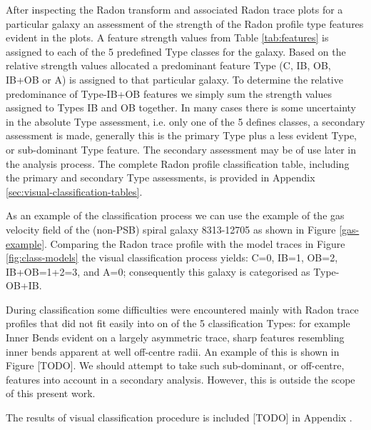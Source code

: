 After inspecting the Radon transform and associated Radon trace plots for a particular galaxy an assessment of the strength of the Radon profile type features evident in the plots. A feature strength values from Table \ref{tab:features} is assigned to each of the 5 predefined Type classes for the galaxy. Based on the relative strength values allocated a predominant feature Type (C, IB, OB, IB+OB or A) is assigned to that particular galaxy. To determine the relative predominance of Type-IB+OB features we simply sum the strength values assigned to Types IB and OB together. 
In many cases there is some uncertainty in the absolute Type assessment, i.e. only one of the 5 defines classes, a secondary assessment is made,  generally this is the primary Type plus a less evident Type, or sub-dominant Type feature. The secondary assessment may be of use later in the analysis process. The complete Radon profile classification table, including the primary and secondary Type assessments, is provided in Appendix \ref{sec:visual-classification-tables}.

As an example of the classification process we can use the example of the gas velocity field of the (non-PSB) spiral galaxy 8313-12705 as shown in Figure \ref{gas-example}. Comparing the Radon trace profile with the model traces in Figure \ref{fig:class-models} the visual classification process yields: C=0, IB=1, OB=2, IB+OB=1+2=3, and A=0; consequently this galaxy is categorised as Type-OB+IB. 

During classification some difficulties were encountered mainly with Radon trace profiles that did not fit easily into on of the 5 classification Types: for example Inner Bends evident on a largely asymmetric trace, sharp features resembling inner bends apparent at well off-centre radii. An example of this is shown in Figure [TODO]. We should attempt to take such sub-dominant, or off-centre, features into account in a secondary analysis. However, this is outside the scope of this present work.

The results of visual classification procedure is included [TODO] in Appendix .  





